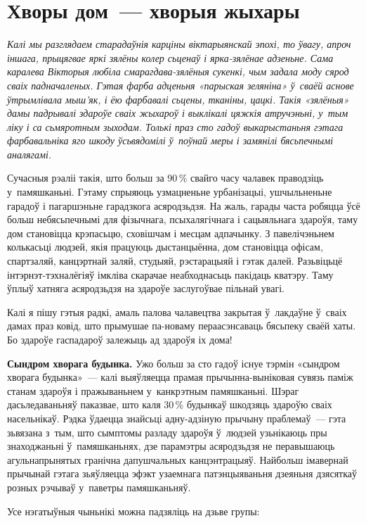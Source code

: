 \section{Хворы дом~--- хворыя жыхары}

\emph{Калі мы разглядаем старадаўнія карціны віктарыянскай эпохі, то ўвагу, апроч іншага, прыцягвае яркі зялёны колер сьценаў і ярка-зялёнае адзеньне. Сама каралева Вікторыя любіла смарагдава-зялёныя сукенкі, чым задала моду сярод сваіх падначаленых. Гэтая фарба адценьня «парыская зеляніна» ў~сваёй аснове ўтрымлівала мыш'як, і ёю фарбавалі сьцены, тканіны, цацкі. Такія «зялёныя» дамы падрывалі здароўе сваіх жыхароў і выклікалі цяжкія атручэньні, у~тым ліку і са сьмяротным зыходам. Толькі праз сто гадоў выкарыстаньня гэтага фарбавальніка яго шкоду ўсьвядомілі ў~поўнай меры і замянілі бясьпечнымі аналягамі.}

Сучасныя рэаліі такія, што больш за 90\,\% свайго часу чалавек праводзіць у~памяшканьні. Гэтаму спрыяюць узмацненьне урбанізацыі, ушчыльненьне гарадоў і пагаршэньне гарадзкога асяродзьдзя. На жаль, гарады часта робяцца ўсё больш небясьпечнымі для фізычнага, псыхалягічнага і сацыяльнага здароўя, таму дом становіцца крэпасьцю, сховішчам і месцам адпачынку. З павелічэньнем колькасьці людзей, якія працуюць дыстанцыённа, дом становіцца офісам, спартзаляй, канцэртнай заляй, студыяй, рэстарацыяй і гэтак далей. Разьвіцьцё інтэрнэт-тэхналёгіяў імкліва скарачае неабходнасьць пакідаць кватэру. Таму ўплыў хатняга асяродзьдзя на здароўе заслугоўвае пільнай увагі.

Калі я пішу гэтыя радкі, амаль палова чалавецтва закрытая ў~лакдаўне ў~сваіх дамах праз ковід, што прымушае па-новаму пераасэнсаваць бясьпеку сваёй хаты. Бо здароўе гаспадароў залежыць ад здароўя іх дома!

\textbf{Сындром хворага будынка.} Ужо больш за сто гадоў існуе тэрмін «сындром хворага будынка»~--- калі выяўляецца прамая прычынна-выніковая сувязь паміж станам здароўя і пражываньнем у~канкрэтным памяшканьні. Шэраг дасьледаваньняў паказвае, што каля 30\,\% будынкаў шкодзяць здароўю сваіх насельнікаў. Рэдка ўдаецца знайсьці адну-адзіную прычыну праблемаў~--- гэта зьвязана з~тым, што сымптомы разладу здароўя ў~людзей узьнікаюць пры знаходжаньні ў~памяшканьнях, дзе парамэтры асяродзьдзя не перавышаюць агульнапрынятых гранічна дапушчальных канцэнтрацыяў. Найбольш імавернай прычынай гэтага зьяўляецца эфэкт узаемнага патэнцыяваньня дзеяньня дзясяткаў розных рэчываў у~паветры памяшканьняў.

Усе нэгатыўныя чыньнікі можна падзяліць на дзьве групы:

